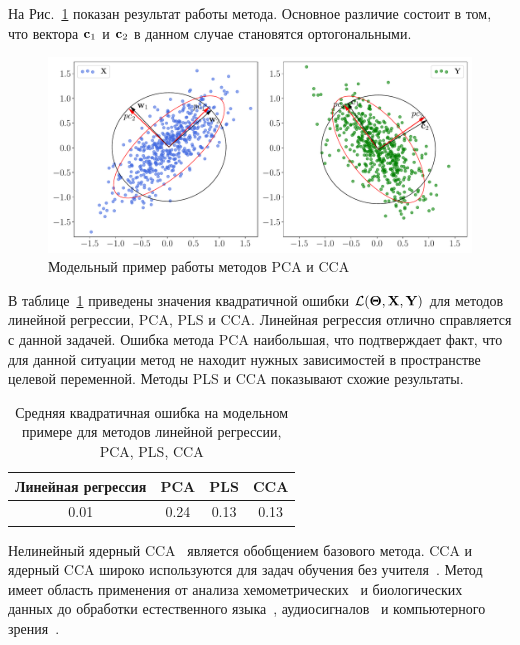 На Рис.~\ref{ch1:fig:cca_toy_example} показан результат работы метода. 
Основное различие состоит в том, что вектора $\mathbf{c}_1$ и $\mathbf{c}_2$ в данном случае становятся ортогональными.

\begin{figure}[h]
	\centering
	\includegraphics[width=\linewidth]{figs/ch1/cca_toy_example}
	\caption{Модельный пример работы методов PCA и CCA}
	\label{ch1:fig:cca_toy_example}
\end{figure}

В таблице~\ref{ch1:tbl:toy_example_results} приведены значения квадратичной ошибки $\mathcal{L}(\boldsymbol{\Theta}, \mathbf{X}, \mathbf{Y})$ для методов линейной регрессии, PCA, PLS и CCA.
Линейная регрессия отлично справляется с данной задачей.
Ошибка метода PCA наибольшая, что подтверждает факт, что для данной ситуации метод не находит нужных зависимостей в пространстве целевой переменной. 
Методы PLS и CCA показывают схожие результаты.

\begin{table}[]
	\centering
	\begin{tabular}{|c|c|c|c|}
		\hline
		\textbf{Линейная регрессия} & \textbf{PCA}   & \textbf{PLS}  &  \textbf{CCA}  \\ \hline
		0.01 &  0.24   &  0.13 &  0.13 \\ \hline
	\end{tabular}
	\caption{Средняя квадратичная ошибка на модельном примере для методов линейной регрессии, PCA, PLS, CCA}
	\label{ch1:tbl:toy_example_results}
\end{table} 

Нелинейный ядерный CCA~\cite{akaho2006kernel,melzer2001nonlinear,bach2002kernel,hardoon2004canonical} является обобщением базового метода. 
CCA и ядерный CCA широко используются для задач обучения без учителя~\cite{hardoon2007unsupervised,vinokourov2003inferring}. 
Метод имеет область применения от анализа хемометрических~\cite{montanarella1995chemometric} и биологических~\cite{vert2003graph} данных до обработки естественного языка~\cite{haghighi2008learning,dhillon2011multi}, аудиосигналов~\cite{choukri1986adaptation,rudzicz2010adaptive} и компьютерного зрения~\cite{kim2007tensor}.

